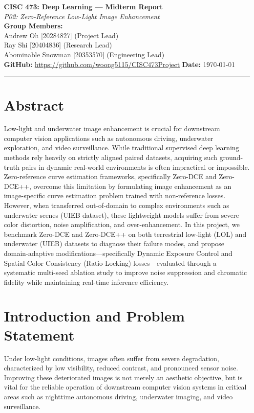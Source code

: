 \documentclass[11pt, letterpaper]{article}
\begin{document}
{\centering
  {\Large\textbf{CISC 473: Deep Learning --- Midterm Report}}\\[0.5em]
  {\large\textit{P02: Zero-Reference Low-Light Image Enhancement}}\\[0.4em]
  \textbf{Group Members:}\\
  {Andrew Oh} [20284827] (Project Lead) \\
  {Ray Shi} [20404836] (Research Lead) \\
  {Abominable Snowman} [20353570] (Engineering Lead)\\[0.3em]
  \textbf{GitHub:} \url{https://github.com/woong5115/CISC473Project} \quad \textbf{Date:} \today\\[0.4em]
  \rule{\linewidth}{0.4pt}
}

\section{Abstract}

Low-light and underwater image enhancement is crucial for downstream computer vision applications such as autonomous driving, underwater exploration, and video surveillance. While traditional supervised deep learning methods rely heavily on strictly aligned paired datasets, acquiring such ground-truth pairs in dynamic real-world environments is often impractical or impossible. Zero-reference curve estimation frameworks, specifically Zero-DCE and Zero-DCE++, overcome this limitation by formulating image enhancement as an image-specific curve estimation problem trained with non-reference losses. However, when transferred out-of-domain to complex environments such as underwater scenes (UIEB dataset), these lightweight models suffer from severe color distortion, noise amplification, and over-enhancement. In this project, we benchmark Zero-DCE and Zero-DCE++ on both terrestrial low-light (LOL) and underwater (UIEB) datasets to diagnose their failure modes, and propose domain-adaptive modifications—specifically Dynamic Exposure Control and Spatial-Color Consistency (Ratio-Locking) losses—evaluated through a systematic multi-seed ablation study to improve noise suppression and chromatic fidelity while maintaining real-time inference efficiency.

\section{Introduction and Problem Statement}

Under low-light conditions, images often suffer from severe degradation, characterized by low visibility, reduced contrast, and pronounced sensor noise. Improving these deteriorated images is not merely an aesthetic objective, but is vital for the reliable operation of downstream computer vision systems in critical areas such as nighttime autonomous driving, underwater imaging, and video surveillance.
\end{document}

